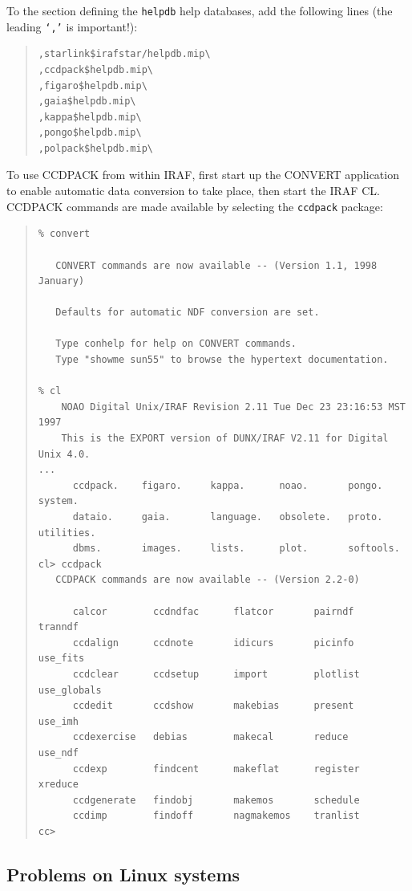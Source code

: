 \documentclass[twoside,11pt]{article}
\newcommand{\xlabel}[1]{}
\renewcommand{\_}{\texttt{\symbol{95}}}
\newcommand{\latexonlysmall}{\small}
\newcommand{\latexonlysmall}{}
\begin{document}
To the section defining the \texttt{helpdb} help databases, add the
following lines (the leading \texttt{`,'} is important!):

\begin{quote}
\begin{verbatim}
,starlink$irafstar/helpdb.mip\
,ccdpack$helpdb.mip\
,figaro$helpdb.mip\
,gaia$helpdb.mip\
,kappa$helpdb.mip\
,pongo$helpdb.mip\
,polpack$helpdb.mip\
\end{verbatim}
\end{quote}

To use CCDPACK from within IRAF, first start up the CONVERT application to
enable automatic data conversion to take place, then start the IRAF
CL\@.  CCDPACK commands are made available by selecting the
\texttt{ccdpack} package:

\begin{quote}
\latexonlysmall
\begin{verbatim}
% convert

   CONVERT commands are now available -- (Version 1.1, 1998 January)

   Defaults for automatic NDF conversion are set.

   Type conhelp for help on CONVERT commands.
   Type "showme sun55" to browse the hypertext documentation.

% cl
    NOAO Digital Unix/IRAF Revision 2.11 Tue Dec 23 23:16:53 MST 1997
    This is the EXPORT version of DUNX/IRAF V2.11 for Digital Unix 4.0.
...
      ccdpack.    figaro.     kappa.      noao.       pongo.      system.
      dataio.     gaia.       language.   obsolete.   proto.      utilities.
      dbms.       images.     lists.      plot.       softools.
cl> ccdpack
   CCDPACK commands are now available -- (Version 2.2-0)

      calcor        ccdndfac      flatcor       pairndf       tranndf
      ccdalign      ccdnote       idicurs       picinfo       use_fits
      ccdclear      ccdsetup      import        plotlist      use_globals
      ccdedit       ccdshow       makebias      present       use_imh
      ccdexercise   debias        makecal       reduce        use_ndf
      ccdexp        findcent      makeflat      register      xreduce
      ccdgenerate   findobj       makemos       schedule
      ccdimp        findoff       nagmakemos    tranlist
cc>
\end{verbatim}
\normalsize
\end{quote}

\subsection{\xlabel{problems_on_linux_systems}Problems on Linux systems}
\label{problems_on_linux_systems}
\end{document}
